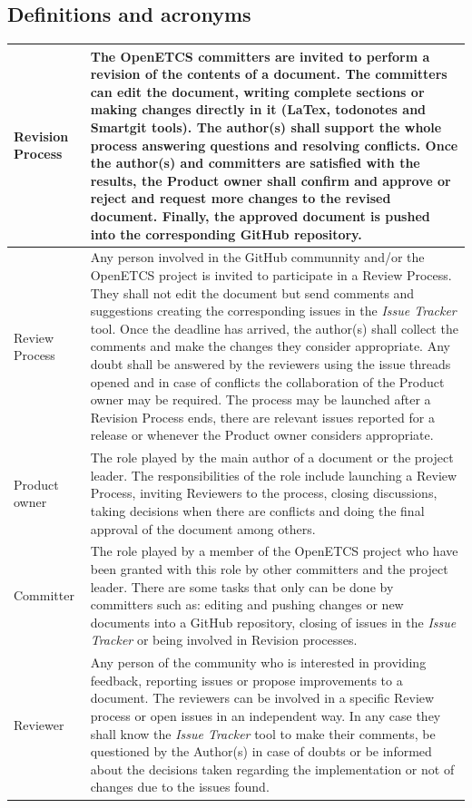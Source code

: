 \documentclass{template/openetcs_article}
\begin{document}
\subsection{Definitions and acronyms}
\tablehead{}
\tabletail{}
\tablelasttail{}
\begin{supertabular}{|m{3cm}m{11cm}|}
\hline
Revision Process &
The OpenETCS committers are invited to perform a revision of the contents of a document. The committers can edit the document, writing complete sections or making changes directly in it (LaTex, todonotes and Smartgit tools). The author(s) shall support the whole process answering questions and resolving conflicts. Once the author(s) and committers are satisfied with the results, the Product owner shall confirm and approve or reject and request more changes to the revised document. Finally, the approved document is pushed into the corresponding GitHub repository.
\\\hline
Review Process &
Any person involved in the GitHub communnity and/or the OpenETCS project is invited to participate in a Review Process. They shall not edit the document but send comments and suggestions creating the corresponding issues in the {\it Issue Tracker} tool. Once the deadline has arrived, the author(s) shall collect the comments and make the changes they consider appropriate. Any doubt shall be answered by the reviewers using the issue threads opened and in case of conflicts the collaboration of the Product owner may be required. The process may be launched after a Revision Process ends, there are relevant issues reported for a release or whenever the Product owner considers appropriate. 
\\\hline
Product owner &
The role played by the main author of a document or the project leader. The responsibilities of the role include launching a Review Process, inviting Reviewers to the process, closing discussions, taking decisions when there are conflicts and doing the final approval of the document among others.
\\\hline
Committer &
The role played by a member of the OpenETCS project who have been granted with this role by other committers and the project leader. There are some tasks that only can be done by committers such as: editing and pushing changes or new documents into a GitHub repository, closing of issues in the {\it Issue Tracker} or being involved in Revision processes.
\\\hline
Reviewer &
Any person of the community who is interested in providing feedback, reporting issues or propose improvements to a document. The reviewers can be involved in a specific Review process or open issues in an independent way. In any case they shall know the {\it Issue Tracker} tool to make their comments, be questioned by the Author(s) in case of doubts or be informed about the decisions taken regarding the implementation or not of changes due to the issues found.
\\\hline   
\end{supertabular}
\end{document}
